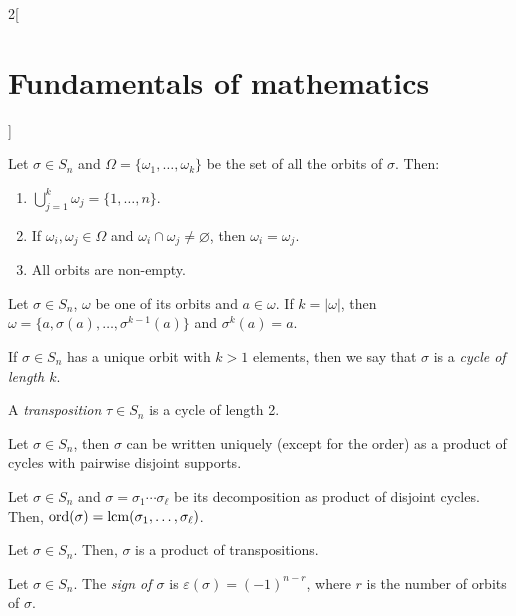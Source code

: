 \documentclass[../../../main.tex]{subfiles}
\begin{document}
\begin{multicols}{2}[\section{Fundamentals of mathematics}]
\begin{definition}
    \end{definition}
    \begin{theorem}
        Let $\sigma\in S_n$ and $\Omega=\{\omega_1,\ldots,\omega_k\}$ be the set of all the orbits of $\sigma$. Then:
        \begin{enumerate}
            \item $\bigcup_{j=1}^k \omega_j=\{1,\ldots,n\}$.
            \item If $\omega_i,\omega_j\in\Omega$ and $\omega_i\cap\omega_j\ne\varnothing$, then $\omega_i=\omega_j$.
            \item All orbits are non-empty.
        \end{enumerate}
    \end{theorem}
    \begin{theorem}
        Let $\sigma\in S_n$, $\omega$ be one of its orbits and $a\in\omega$. If $k=|\omega|$, then $\omega=\{a,\sigma(a),\ldots,\sigma^{k-1}(a)\}$ and $\sigma^k(a)=a$.
    \end{theorem}
    \begin{definition}
        If $\sigma\in S_n$ has a unique orbit with $k>1$ elements, then we say that $\sigma$ is a \textit{cycle of length $k$}.
    \end{definition}
    \begin{definition}
        A \textit{transposition} $\tau\in S_n$ is a cycle of length 2.
    \end{definition}
    \begin{theorem}
        Let $\sigma\in S_n$, then $\sigma$ can be written uniquely (except for the order) as a product of cycles with pairwise disjoint supports.
    \end{theorem}
    \begin{corollary}
        Let $\sigma\in S_n$ and $\sigma=\sigma_1\cdots\sigma_\ell$ be its decomposition as product of disjoint cycles. Then, $\text{ord}(\sigma)=\operatorname{lcm}(\sigma_1,\ldots,\sigma_\ell)$.
    \end{corollary}
    \begin{corollary}
        Let $\sigma\in S_n$. Then, $\sigma$ is a product of transpositions.
    \end{corollary}
    \begin{definition}
        Let $\sigma\in S_n$. The \textit{sign of $\sigma$} is $\varepsilon(\sigma)=(-1)^{n-r}$, where $r$ is the number of orbits of $\sigma$.
    \end{definition}
    \begin{theorem}

\end{theorem}
\end{multicols}
\end{document}
